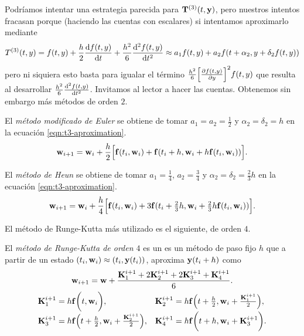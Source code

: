 Podríamos intentar una estrategia parecida para $\vb{T}^{(3)}(t, \vb{y})$,
pero nuestros intentos fracasan porque
(haciendo las cuentas con escalares)
si intentamos aproximarlo mediante
\begin{equation}\label{eqn:t3-aproximation}
    T^{(3)}(t,y) =
    f(t,y) + \frac{h}{2}\dv{f(t,y)}{t} + \frac{h^2}{6}\dv[2]{f(t,y)}{t} \approx
    a_1f(t,y) + a_2f(t+\alpha_2, y+\delta_2f(t,y))
\end{equation}
pero ni siquiera esto basta para igualar el término
$\frac{h^2}{6}\qty[\pdv{f(t, y)}{y}]^2f(t,y)$
que resulta al desarrollar $\frac{h^2}{6}\dv[2]{f(t, y)}{t}$.
Invitamos al lector a hacer las cuentas.
Obtenemos sin embargo más métodos de orden $2$.

\begin{method}
    El \emph{método modificado de Euler} se obtiene de
    tomar $a_1 = a_2 = \frac{1}{2}$ y $\alpha_2 = \delta_2 = h$
    en la ecuación  \eqref{eqn:t3-aproximation}.
    \begin{equation*}
        \vb{w}_{i+1} = \vb{w}_i + \frac{h}{2}\qty\Big[
            \vb{f}(t_i, \vb{w}_i) + \vb{f}(t_i + h, \vb{w}_i + h\vb{f}(t_i,\vb{w}_i))
        ].
    \end{equation*}
\end{method}

\begin{method}
    El \emph{método de Heun} se obtiene de tomar $a_1 = \frac{1}{4}$,
    $a_2 = \frac{3}{4}$ y $\alpha_2 = \delta_2 = \frac{2}{3}h$
    en la ecuación \eqref{eqn:t3-aproximation}.
    \begin{equation*}
        \vb{w}_{i+1} = \vb{w}_i + \frac{h}{4}\qty\Big[
            \vb{f}(t_i, \vb{w}_i) +
            3\vb{f}(t_i + \tfrac{2}{3}h, \vb{w}_i + \tfrac{2}{3}h\vb{f}(t_i, \vb{w}_i))
        ].
    \end{equation*}

\end{method}

El método de Runge-Kutta más utilizado es el siguiente, de orden $4$.

\begin{method}\label{met:euler}
    \newcommand{\K}{\vb{K}}

    El \emph{método de Runge-Kutta de orden $4$}
    es un es un método de paso fijo $h$ que
    a partir de un estado $(t_i, \vb{w}_i) \approx (t_i, \vb{y}(t_i))$,
    aproxima $\vb{y}(t_i + h)$ como
    \begin{gather*}
        \vw_{i+1} = \vw + \frac{
            \K_1^{i+1} + 2\K_2^{i+1} + 2\K_3^{i+1} + \K_4^{i+1}
        }{6}. \\
        \begin{array}{ll}
        \K_1^{i+1} = h\vf\qty\bigg(t, \vw_i), &
        \K_2^{i+1} = h\vf\qty(t + \frac{h}{2}, \vw_i+ \frac{\K_1^{i+1}}{2}), \\
        \K_3^{i+1} = h\vf\qty(t + \frac{h}{2}, \vw_i+ \frac{\K_2^{i+1}}{2}), &
        \K_4^{i+1} = h\vf\qty\bigg(t + h, \vw_i + \K_3^{i+1}).
        \end{array}
    \end{gather*}
\end{method}

